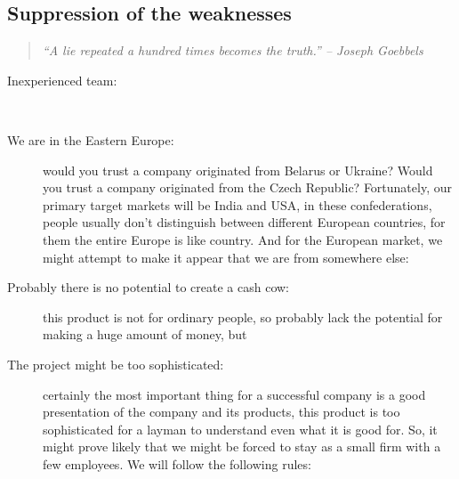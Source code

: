 \documentclass[a4paper,twoside,15pt]{book}
\begin{document}
		\subsection{Suppression of the weaknesses}
			\begin{quote}
				\textit{``A lie repeated a hundred times becomes the truth.'' -- Joseph Goebbels}
			\end{quote}
			 \begin{description}
				\item[Inexperienced team:]~
				\item[We are in the Eastern Europe:]
					would you trust a company originated from Belarus or Ukraine? Would you trust a company originated from the Czech Republic? Fortunately, our primary target markets will be India and USA, in these confederations, people usually don't distinguish between different European countries, for them the entire Europe is like country. And for the European market, we might attempt to make it appear that we are from somewhere else:
				\item[Probably there is no potential to create a cash cow:]
					this product is not for ordinary people, so probably lack the potential for making a huge amount of money, but
				\item[The project might be too sophisticated:]
					certainly the most important thing for a successful company is a good presentation of the company and its products, this product is too sophisticated for a layman to understand even what it is good for. So, it might prove likely that we might be forced to stay as a small firm with a few employees. We will follow the following rules:

\end{description}
\end{document}
